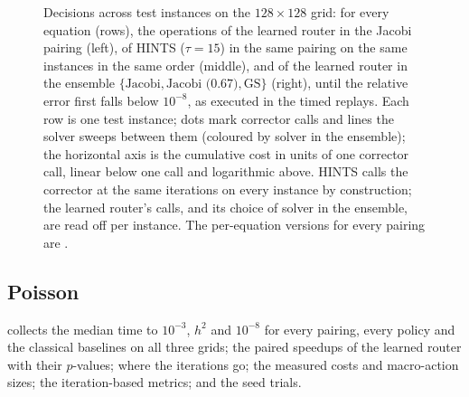 \begin{figure}[H]
\color{red}
    \centering
    \caption{Decisions across test instances on the $128\times128$ grid: for every equation (rows), the operations of the learned router in the Jacobi pairing (left), of HINTS ($\tau{=}15$) in the same pairing on the same instances in the same order (middle), and of the learned router in the ensemble $\{\text{Jacobi}, \text{Jacobi (0.67)}, \text{GS}\}$ (right), until the relative error first falls below $10^{-8}$, as executed in the timed replays. Each row is one test instance; dots mark corrector calls and lines the solver sweeps between them (coloured by solver in the ensemble); the horizontal axis is the cumulative cost in units of one corrector call, linear below one call and logarithmic above. HINTS calls the corrector at the same iterations on every instance by construction; the learned router's calls, and its choice of solver in the ensemble, are read off per instance. The per-equation versions for every pairing are .}
    \label{fig:ca_decisions_overview}
\end{figure}

\subsection{Poisson} \label{sec:wc_poisson}

 collects the median time to $10^{-3}$, $h^2$ and $10^{-8}$ for every pairing, every policy and the classical baselines on all three grids;  the paired speedups of the learned router with their $p$-values;  where the iterations go;  the measured costs and macro-action sizes;  the iteration-based metrics; and  the seed trials.

